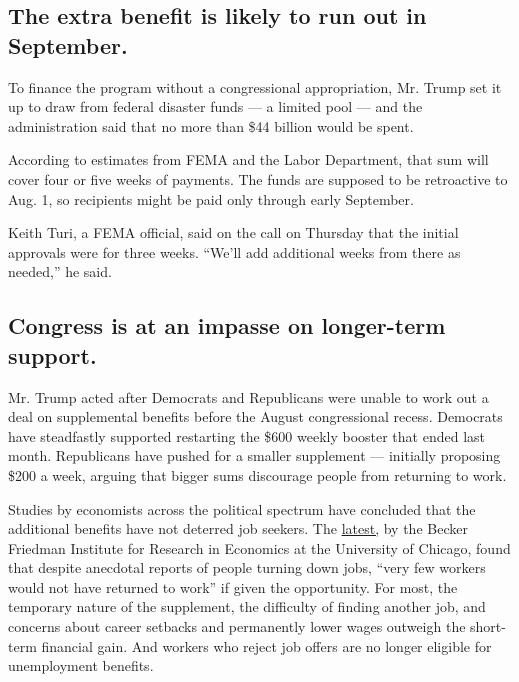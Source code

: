 \hypertarget{the-extra-benefit-is-likely-to-run-out-in-september}{%
\subsection{The extra benefit is likely to run out in
September.}\label{the-extra-benefit-is-likely-to-run-out-in-september}}

To finance the program without a congressional appropriation, Mr. Trump
set it up to draw from federal disaster funds --- a limited pool --- and
the administration said that no more than \$44 billion would be spent.

According to estimates from FEMA and the Labor Department, that sum will
cover four or five weeks of payments. The funds are supposed to be
retroactive to Aug. 1, so recipients might be paid only through early
September.

Keith Turi, a FEMA official, said on the call on Thursday that the
initial approvals were for three weeks. ``We'll add additional weeks
from there as needed,'' he said.

\hypertarget{congress-is-at-an-impasse-on-longer-term-support}{%
\subsection{Congress is at an impasse on longer-term
support.}\label{congress-is-at-an-impasse-on-longer-term-support}}

Mr. Trump acted after Democrats and Republicans were unable to work out
a deal on supplemental benefits before the August congressional recess.
Democrats have steadfastly supported restarting the \$600 weekly booster
that ended last month. Republicans have pushed for a smaller supplement
--- initially proposing \$200 a week, arguing that bigger sums
discourage people from returning to work.

Studies by economists across the political spectrum have concluded that
the additional benefits have not deterred job seekers. The
\href{https://bfi.uchicago.edu/working-paper/2020-112/}{latest,} by the
Becker Friedman Institute for Research in Economics at the University of
Chicago, found that despite anecdotal reports of people turning down
jobs, ``very few workers would not have returned to work'' if given the
opportunity. For most, the temporary nature of the supplement, the
difficulty of finding another job, and concerns about career setbacks
and permanently lower wages outweigh the short-term financial gain. And
workers who reject job offers are no longer eligible for unemployment
benefits.

